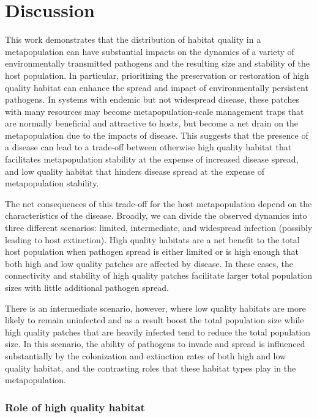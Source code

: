 \documentclass{article}
\begin{document}
\section{Discussion}
\label{discussion} 

This work demonstrates that the distribution of habitat quality in a metapopulation can have substantial impacts on the dynamics of a variety of environmentally transmitted pathogens and the resulting size and stability of the host population.
In particular, prioritizing the preservation or restoration of high quality habitat can enhance the spread and impact of environmentally persistent pathogens.  
In systems with endemic but not widespread disease, these patches with many resources may become metapopulation-scale management traps that are normally beneficial and attractive to hosts, but become a net drain on the metapopulation due to the impacts of disease. 
This suggests that the presence of a disease can lead to a trade-off between otherwise high quality habitat that facilitates metapopulation stability at the expense of increased disease spread, and low quality habitat that hinders disease spread at the expense of metapopulation stability.

The net consequences of this trade-off for the host metapopulation depend on the characteristics of the disease.
Broadly, we can divide the observed dynamics into three different scenarios: limited, intermediate, and widespread infection (possibly leading to host extinction). 
High quality habitats are a net benefit to the total host population when pathogen spread is either limited or is high enough that both high and low quality patches are affected by disease. 
In these cases, the connectivity and stability of high quality patches facilitate larger total population sizes with little additional pathogen spread.

There is an intermediate scenario, however, where low quality habitats are more likely to remain uninfected and as a result boost the total population size while high quality patches that are heavily infected tend to reduce the total population size. 
In this scenario, the ability of pathogens to invade and spread is influenced substantially by the colonization and extinction rates of both high and low quality habitat, and the contrasting roles that these habitat types play in the metapopulation.

\subsubsection*{Role of high quality habitat}
\end{document}
